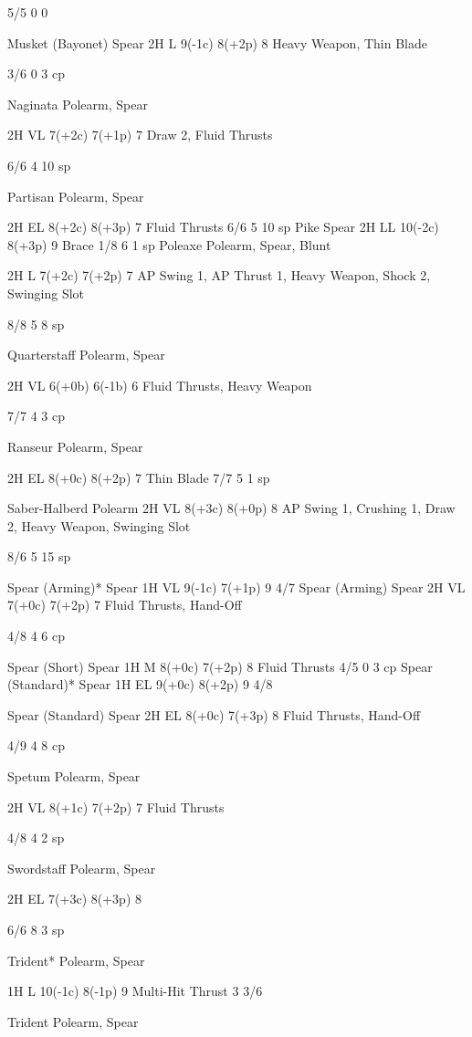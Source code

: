 \documentclass[oneside,11pt,english]{book}
\begin{document}
5/5 0 0 

Musket (Bayonet) Spear 2H L 9(-1c) 8(+2p) 8 Heavy Weapon, 
Thin Blade 

3/6 0 3 cp 

Naginata Polearm, 
Spear 

2H VL 7(+2c) 7(+1p) 7 Draw 2, Fluid 
Thrusts 

6/6 4 10 
sp 

Partisan Polearm, 
Spear 

2H EL 8(+2c) 8(+3p) 7 Fluid Thrusts 6/6 5 10 
sp 
Pike Spear 2H LL 10(-2c) 8(+3p) 9 Brace 1/8 6 1 sp 
Poleaxe Polearm, 
Spear, 
Blunt 

2H L 7(+2c) 7(+2p) 7 AP Swing 1, AP 
Thrust 1, Heavy 
Weapon, Shock 2, 
Swinging Slot 

8/8 5 8 sp 

Quarterstaff Polearm, 
Spear 

2H VL 6(+0b) 6(-1b) 6 Fluid Thrusts, 
Heavy Weapon 

7/7 4 3 cp 

Ranseur Polearm, 
Spear 

2H EL 8(+0c) 8(+2p) 7 Thin Blade 7/7 5 1 sp 

Saber-Halberd Polearm 2H VL 8(+3c) 8(+0p) 8 AP Swing 1, 
Crushing 1, Draw 
2, Heavy Weapon, 
Swinging Slot 

8/6 5 15 
sp 

Spear (Arming)* Spear 1H VL 9(-1c) 7(+1p) 9 4/7 
Spear (Arming) Spear 2H VL 7(+0c) 7(+2p) 7 Fluid Thrusts, 
Hand-Off 

4/8 4 6 cp 

Spear (Short) Spear 1H M 8(+0c) 7(+2p) 8 Fluid Thrusts 4/5 0 3 cp 
Spear (Standard)* Spear 1H EL 9(+0c) 8(+2p) 9 4/8 


Spear (Standard) Spear 2H EL 8(+0c) 7(+3p) 8 Fluid Thrusts, 
Hand-Off 

4/9 4 8 cp 

Spetum Polearm, 
Spear 

2H VL 8(+1c) 7(+2p) 7 Fluid Thrusts 

 

4/8 4 2 sp 

Swordstaff Polearm, 
Spear 

2H EL 7(+3c) 8(+3p) 8 

 

6/6 8 3 sp 

Trident* Polearm, 
Spear 

1H L 10(-1c) 8(-1p) 9 Multi-Hit Thrust 3 3/6 

Trident Polearm, 
Spear 
\end{document}
